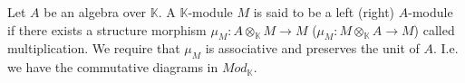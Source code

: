 \documentclass[../thesis.tex]{subfiles}
\begin{document}
            \begin{definition}[Modules]
                Let $A$ be an algebra over $\mathbb{K}$. A $\mathbb{K}$-module $M$ is said to be a left (right) $A$-module if there exists a structure morphism $\mu_M : A\otimes_{\mathbb{K}}M \rightarrow M$ ($\mu_M : M\otimes_{\mathbb{K}}A \rightarrow M$) called multiplication. We require that $\mu_M$ is associative and preserves the unit of $A$. I.e. we have the commutative diagrams in $Mod_\mathbb{K}$.
                \begin{center}
                \end{center}
                        


                        
                        

\end{definition}
\end{document}
